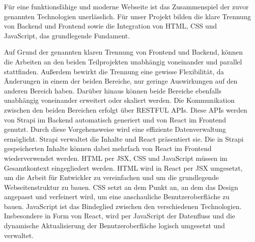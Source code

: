 Für eine funktionsfähige und moderne Webseite ist das Zusammenspiel der zuvor genannten Technologien unerlässlich. Für unser Projekt bilden die klare Trennung von Backend und Frontend sowie die Integration von HTML, CSS und JavaScript, das grundlegende Fundament.

Auf Grund der genannten klaren Trennung von Frontend und Backend, können die Arbeiten an den beiden Teilprojekten unabhängig voneinander und parallel stattfinden. Außerdem bewirkt die Trennung eine gewisse Flexibilität, da Änderungen in einem der beiden Bereiche, nur geringe Auswirkungen auf den anderen Bereich haben. Darüber hinaus können beide Bereiche ebenfalls unabhängig voneinander erweitert oder skaliert werden.
Die Kommunikation zwischen den beiden Bereichen erfolgt über RESTFUL APIs. Diese APIs werden von Strapi im Backend automatisch generiert und von React im Frontend genutzt. Durch diese Vorgehensweise wird eine effiziente Datenverwaltung ermöglicht. Strapi verwaltet die Inhalte und React präsentiert sie. Die in Strapi gespeicherten Inhalte können dabei mehrfach von React im Frontend wiederverwendet werden.
HTML per JSX, CSS und JavaScript müssen im Gesamtkontext eingegliedert werden. HTML wird in React per JSX umgesetzt, um die Arbeit für Entwickler zu vereinfachen und um die grundlegende Webseitenstruktur zu bauen. CSS setzt an dem Punkt an, an dem das Design angepasst und verfeinert wird, um eine anschauliche Benutzeroberfläche zu bauen. JavaScript ist das Bindeglied zwischen den verschiedenen Technologien. Insbesondere in Form von React, wird per JavaScript der Datenfluss und die dynamische Aktualisierung der Benutzeroberfläche logisch umgesetzt und verwaltet.